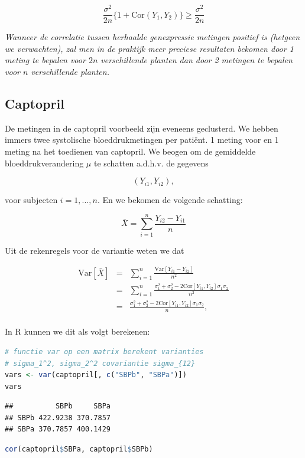 \documentclass[
  12pt,dutch,coursenotes]{book}
\begin{document}
\[\frac{\sigma^2}{2n}\{1+\text{Cor}(Y_{1},Y_{2})\}\geq \frac{\sigma^2}{2n}\]

\emph{Wanneer de correlatie tussen herhaalde genexpressie metingen positief is (hetgeen we verwachten), zal men in de praktijk meer preciese resultaten bekomen door 1 meting te bepalen voor \(2n\) verschillende planten dan door 2 metingen te bepalen voor \(n\) verschillende planten.}

\hypertarget{captopril}{%
\subsection{Captopril}\label{captopril}}

De metingen in de captopril voorbeeld zijn eveneens geclusterd. We hebben immers twee systolische bloeddrukmetingen per patiënt.
1 meting voor en 1 meting na het toedienen van captopril.
We beogen om de gemiddelde bloeddrukverandering \(\mu\) te schatten a.d.h.v. de gegevens

\[(Y_{i1} , Y_{i2}),\]

voor subjecten \(i = 1, ..., n\).
En we bekomen de volgende schatting:

\[\bar X = \sum_{i=1}^n \frac{Y_{i2}-Y_{i1}}{n}\]

Uit de rekenregels voor de variantie weten we dat

\begin{eqnarray*}
\text{Var}\left[\bar X\right]&=&\sum_{i=1}^n \frac{\text{Var}\left[Y_{i1}-Y_{i2}\right]}{n^2}\\
&=&\sum_{i=1}^n \frac{\sigma^2_1+\sigma^2_2-2\text{Cor}\left[Y_{i1},Y_{i2}\right]\sigma_1\sigma_2}{n^2}\\
&=&\frac{\sigma^2_1+\sigma^2_2-2\text{Cor}\left[Y_{i1},Y_{i2}\right]\sigma_1\sigma_2}{n},\\
\end{eqnarray*}

In R kunnen we dit als volgt berekenen:

\begin{lstlisting}[language=R]
# functie var op een matrix berekent varianties
# sigma_1^2, sigma_2^2 covariantie sigma_{12}
vars <- var(captopril[, c("SBPb", "SBPa")])
vars
\end{lstlisting}

\begin{lstlisting}
##          SBPb     SBPa
## SBPb 422.9238 370.7857
## SBPa 370.7857 400.1429
\end{lstlisting}

\begin{lstlisting}[language=R]
cor(captopril$SBPa, captopril$SBPb)
\end{lstlisting}
\end{document}
